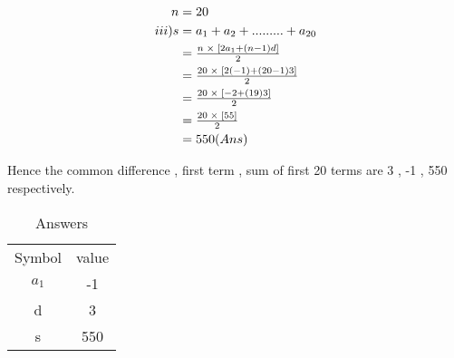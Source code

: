 \documentclass[journal, 12pt, twocolumn]{IEEEtran}
\begin{document}
    \pagebreak
   
    \begin{align*}
\LARGE        n &= 20 \\ 
        iii)  s &= a_1 + a_2 + ......... + a_{20}\\
               &= \tfrac{n\;\times\;\left[2a_1 + (n-1)d\right]}{2} \\
               &= \tfrac{20\;\times\;[2(-1) + (20-1)3] }{2} \\
               &= \tfrac{20\;\times\;[-2 + (19)3]}{2} \\
               &= \tfrac{20\; \times  \;[55]}{2} \\
               &= 550 (Ans)
\end{align*} 

Hence the common difference , first term , sum of first 20 terms are  3 , -1 , 550 respectively.

\begin{table}[h!]
\caption{Answers}
    \centering
    \begin{tabular}{|c|c|}
        \hline
        Symbol & value \\
         $ a_1 $ &  -1  \\
          d    &   3  \\
          s    &   550  \\
          \hline
    \end{tabular}
\end{table}
    
\end{document}
